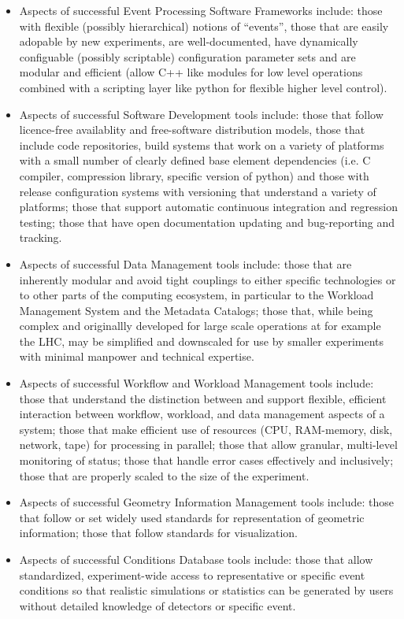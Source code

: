 \begin{itemize}

\item Aspects of successful Event Processing Software Frameworks include: 
those with flexible (possibly hierarchical) notions of ``events'', 
those that are easily adopable by new experiments, are well-documented, 
have dynamically configuable (possibly scriptable) configuration 
parameter sets and are modular and efficient (allow C++ like modules 
for low level 
operations combined with a scripting layer like python for flexible 
higher level control).

\item Aspects of successful Software Development tools include:
those that follow licence-free availablity and free-software distribution models, 
those that include code repositories, build systems that work on a variety of platforms 
with a small number of clearly defined base element dependencies 
(i.e. C compiler, compression library, specific version of python) and those with release 
configuration systems with versioning that understand a variety of 
platforms; those that support automatic continuous integration and 
regression testing; those that have open documentation updating and  
bug-reporting and tracking.

\item Aspects of successful Data Management tools include:
those that are inherently modular and avoid tight couplings to either 
specific technologies or to other parts of the computing ecosystem, in 
particular to the Workload Management System and the Metadata Catalogs;  
those that, while being complex and originallly developed for large scale operations 
at for example the LHC, may be simplified and downscaled for use by smaller experiments 
with minimal manpower and technical expertise. 

\item Aspects of successful Workflow and Workload Management tools include:
those that understand the distinction between and support flexible, efficient 
interaction between workflow, workload, and data management aspects 
of a system; those that make efficient use of resources (CPU, RAM-memory, 
disk, network, tape) for processing in parallel;  those that allow 
granular, multi-level monitoring of status; those that handle error 
cases effectively and inclusively; those that are properly scaled 
to the size of the experiment.

\item Aspects of successful Geometry Information Management tools include:
those that follow or set widely used standards for representation of
geometric information; those that follow standards for visualization.

\item Aspects of successful Conditions Database tools include:
those that allow standardized, experiment-wide access to representative 
or specific event conditions so that realistic simulations or statistics
can be generated by users without detailed knowledge of detectors or specific
event.

\end{itemize}

